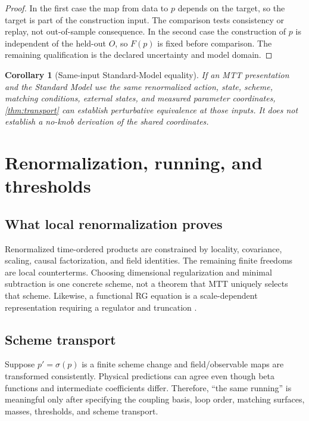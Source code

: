 \documentclass[11pt,a4paper]{article}
\numberwithin{equation}{section}
\newtheorem{corollary}[theorem]{Corollary}
\theoremstyle{definition}
\theoremstyle{remark}
\begin{document}
\begin{proof}
In the first case the map from data to \(p\) depends on the target, so the
target is part of the construction input.  The comparison tests
consistency or replay, not out-of-sample consequence.  In the second case
the construction of \(p\) is independent of the held-out \(O\), so
\(F(p)\) is fixed before comparison.  The remaining qualification is the
declared uncertainty and model domain.
\end{proof}

\begin{corollary}[Same-input Standard-Model equality]
If an MTT presentation and the Standard Model use the same renormalized
action, state, scheme, matching conditions, external states, and measured
parameter coordinates, \cref{thm:transport} can establish perturbative
equivalence at those inputs.  It does not establish a no-knob derivation of
the shared coordinates.
\end{corollary}

\section{Renormalization, running, and thresholds}

\subsection{What local renormalization proves}

Renormalized time-ordered products are constrained by locality, covariance,
scaling, causal factorization, and field identities.  The remaining finite
freedoms are local counterterms.  Choosing dimensional regularization and
minimal subtraction is one concrete scheme, not a theorem that MTT
uniquely selects that scheme.  Likewise, a functional RG equation is a
scale-dependent representation requiring a regulator and truncation
\cite{Wetterich1993,BergesTetradisWetterich2002}.

\subsection{Scheme transport}

Suppose \(p'=\sigma(p)\) is a finite scheme change and field/observable
maps are transformed consistently.  Physical predictions can agree even
though beta functions and intermediate coefficients differ.  Therefore,
``the same running'' is meaningful only after specifying the coupling
basis, loop order, matching surfaces, masses, thresholds, and scheme
transport.
\end{document}
